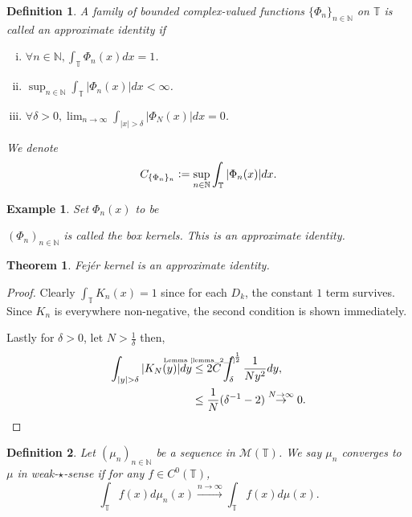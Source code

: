 \documentclass[8pt]{article}
\newtheorem{theorem}{Theorem} [section]
\newtheorem{definition}{Definition}[section]
\newtheorem{example}{Example}[section]
\newcommand{\ztext}[1]{\text{\makebox[0pt][c]{\tiny #1}}}
\newcommand{\ab}[1]{\vert #1 \vert}
\newcommand{\defeq}{\vcentcolon=}
\newcommand{\bN}[0]{\mathbb{N}}
\newcommand{\bT}[0]{\mathbb{T}}
\newcommand{\cM}[0]{\mathcal{M}}
\begin{document}
\begin{definition}
  A family of bounded complex-valued functions $\{\Phi_n\}_{n\in \bN}$ on $\bT$ is called an approximate identity if 
  \begin{enumerate}[i.]
    \item $\forall n\in\bN,\int_\bT\Phi_n(x)dx = 1$.
    \item $\sup_{n\in\bN}\int_\bT\vert\Phi_n(x)\vert dx <\infty$.
    \item $\forall \delta>0,\lim_{n\to\infty}\int_{\ab{x}>\delta}\ab{\Phi_N(x)}dx = 0$.
  \end{enumerate}
    We denote 
  \begin{equation*}
    C_{\{\Phi_n\}_n} \defeq \sup_{n\in\bN}\int_\bT\vert\Phi_n(x)\vert dx.
  \end{equation*}
\end{definition}
\begin{example}
  Set $\Phi_n(x)$ to be 
    \begin{center}
  \end{center}
  $(\Phi_n)_{n\in\bN}$ is called the box kernels. This is an approximate identity.
\end{example}
\begin{theorem}
  \label{theorem_2_2}
  Fejér kernel is an approximate identity.
\end{theorem}
\begin{proof}
  Clearly $\int_{\bT}K_n(x) = 1$ since for each $D_k$, the constant $1$ term survives. Since $K_n$ is everywhere non-negative, the second condition is shown immediately.
  \par Lastly for $\delta>0$, let $N>{\frac 1 \delta}$ then,
  \begin{align*}
    \int_{\ab{y}>\delta}\ab{K_N(y)}dy &\stackrel{\ztext{Lemma \ref{lemma_2_7}}}{\leq} 2C\int_\delta^{{\frac 1 2}}{\frac 1 {Ny^2}}dy,\\
    & \leq {\frac 1 N}(\delta^{-1}-2)\stackrel{N\to \infty}{\to}0.
  \end{align*} 
\end{proof}
\begin{definition}
  Let $(\mu_n)_{n\in\bN}$ be a sequence in $\cM(\bT)$. We say $\mu_n$ converges to $\mu$ in weak-$\star$-sense if for any $f\in C^0(\bT)$, 
  \begin{equation*}
    \int_\bT f(x)d\mu_n(x)\stackrel{n\to\infty}{\to}\int_\bT f(x)d\mu(x).
  \end{equation*}
\end{definition}
\end{document}
